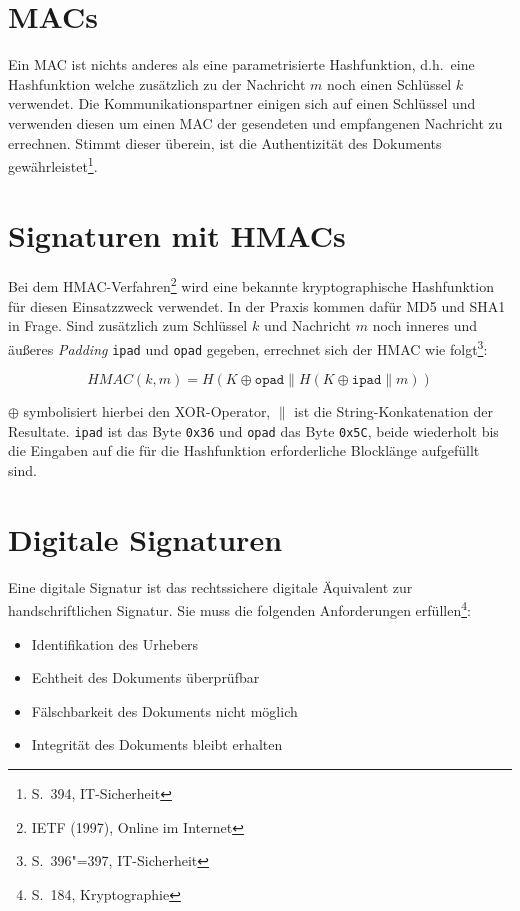 \section{\ac{MAC}s}

Ein \ac{MAC} ist nichts anderes als eine parametrisierte Hashfunktion,
d.h.~eine Hashfunktion welche zusätzlich zu der Nachricht $m$ noch
einen Schlüssel $k$ verwendet.  Die Kommunikationspartner einigen sich
auf einen Schlüssel und verwenden diesen um einen \ac{MAC} der
gesendeten und empfangenen Nachricht zu errechnen.  Stimmt dieser
überein, ist die Authentizität des Dokuments
gewährleistet\footnote{S.~394, IT-Sicherheit}.

\section{Signaturen mit \ac{HMAC}s}

Bei dem \ac{HMAC}-Verfahren\footnote{IETF (1997), Online im Internet}
wird eine bekannte kryptographische Hashfunktion für diesen
Einsatzzweck verwendet.  In der Praxis kommen dafür MD5 und SHA1 in
Frage.  Sind zusätzlich zum Schlüssel $k$ und Nachricht $m$ noch
inneres und äußeres \emph{Padding} \texttt{ipad} und \texttt{opad}
gegeben, errechnet sich der \ac{HMAC} wie folgt\footnote{S.~396"=397,
  IT-Sicherheit}:

$$HMAC(k, m) = H(K \oplus \texttt{opad} \parallel H(K \oplus \texttt{ipad} \parallel m))$$

$\oplus$ symbolisiert hierbei den XOR-Operator, $\parallel$ ist die
String-Konkatenation der Resultate.  \texttt{ipad} ist das Byte
\texttt{0x36} und \texttt{opad} das Byte \texttt{0x5C}, beide
wiederholt bis die Eingaben auf die für die Hashfunktion erforderliche
Blocklänge aufgefüllt sind.

\section{Digitale Signaturen}

Eine digitale Signatur ist das rechtssichere digitale Äquivalent zur
handschriftlichen Signatur.  Sie muss die folgenden Anforderungen
erfüllen\footnote{S.~184, Kryptographie}:

\begin{itemize}
\item Identifikation des Urhebers
\item Echtheit des Dokuments überprüfbar
\item Fälschbarkeit des Dokuments nicht möglich
\item Integrität des Dokuments bleibt erhalten
\end{itemize}

